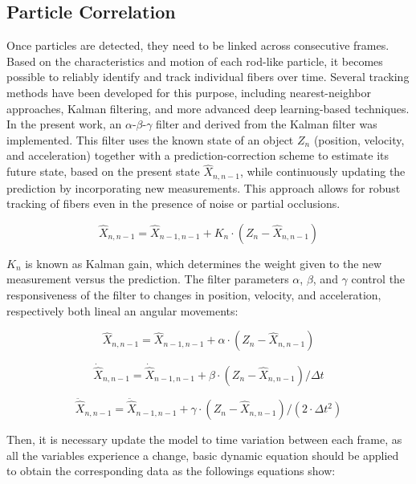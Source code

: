\subsection{Particle Correlation}

Once particles are detected, they need to be linked across consecutive frames. Based on the characteristics and motion of each rod-like particle, it becomes possible to reliably identify and track individual fibers over time. Several tracking methods have been developed for this purpose, including nearest-neighbor approaches, Kalman filtering, and more advanced deep learning-based techniques. In the present work, an $\alpha$-$\beta$-$\gamma$ filter \cite{tenne2000optimal} and \cite{gray1993derivation} derived from the Kalman filter \cite{welch1995introduction} was implemented. This filter uses the known state of an object $Z_n$ (position, velocity, and acceleration) together with a prediction-correction scheme to estimate its future state, based on the present state $\hat{X}_{n,n-1}$, while continuously updating the prediction by incorporating new measurements. This approach allows for robust tracking of fibers even in the presence of noise or partial occlusions. 

\begin{equation}
    \hat{X}_{n,n-1} = \hat{X}_{n-1,n-1} + K_n \cdot (Z_n - \hat{X}_{n,n-1})
\end{equation}

$K_n$ is known as Kalman gain, which determines the weight given to the new measurement versus the prediction. The filter parameters $\alpha$, $\beta$, and $\gamma$ control the responsiveness of the filter to changes in position, velocity, and acceleration, respectively both lineal an angular movements:

\begin{equation}
    \hat{X}_{n,n-1} = \hat{X}_{n-1,n-1} + \alpha \cdot (Z_n - \hat{X}_{n,n-1})
\end{equation}

\begin{equation}
    \dot{\hat{X}}_{n,n-1} = \dot{\hat{X}}_{n-1,n-1} + \beta \cdot (Z_n - \hat{X}_{n,n-1}) / \Delta t
\end{equation}

\begin{equation}
    \ddot{\hat{X}}_{n,n-1} = \ddot{\hat{X}}_{n-1,n-1} + \gamma \cdot (Z_n - \hat{X}_{n,n-1}) / (2 \cdot \Delta t^2)
\end{equation}

Then, it is necessary update the model to time variation between each frame, as all the variables experience a change, basic dynamic equation should be applied to obtain the corresponding data as the followings equations show: 


